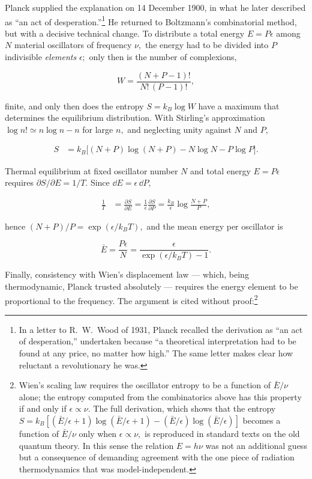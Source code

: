 Planck supplied the explanation on 14 December 1900, in what he later described as ``an act of desperation.''\footnote{In a letter to R.~W.~Wood of 1931, Planck recalled the derivation as ``an act of desperation,'' undertaken because ``a theoretical interpretation had to be found at any price, no matter how high.'' The same letter makes clear how reluctant a revolutionary he was.} He returned to Boltzmann's combinatorial method, but with a decisive technical change. To distribute a total energy $E=P\epsilon$ among $N$ material oscillators of frequency $\nu,$ the energy had to be divided into $P$ indivisible \emph{elements} $\epsilon;$ only then is the number of complexions,
\begin{linenomath}
    \begin{equation}
        W=\frac{(N+P-1)!}{N!\,(P-1)!},
    \end{equation}
\end{linenomath}
finite, and only then does the entropy $S=k_B\log W$ have a maximum that determines the equilibrium distribution. With Stirling's approximation $\log n!\simeq n\log n-n$ for large $n,$ and neglecting unity against $N$ and $P,$
\begin{linenomath}
    \begin{align}
        S&=k_B\bigl[(N+P)\log(N+P)-N\log N-P\log P\bigr].
    \end{align}
\end{linenomath}
Thermal equilibrium at fixed oscillator number $N$ and total energy $E=P\epsilon$ requires $\partial S/\partial E=1/T.$ Since $\dd E=\epsilon\,\dd P,$
\begin{linenomath}
    \begin{align}
        \frac{1}{T}&=\frac{\partial S}{\partial E}
        =\frac{1}{\epsilon}\frac{\partial S}{\partial P}
        =\frac{k_B}{\epsilon}\log\frac{N+P}{P},
    \end{align}
\end{linenomath}
hence $(N+P)/P=\exp(\epsilon/k_BT),$ and the mean energy per oscillator is
\begin{linenomath}
    \begin{equation}
        \bar{E}=\frac{P\epsilon}{N}=\frac{\epsilon}{\exp(\epsilon/k_BT)-1}.
    \end{equation}
\end{linenomath}
Finally, consistency with Wien's displacement law --- which, being thermodynamic, Planck trusted absolutely --- requires the energy element to be proportional to the frequency. The argument is cited without proof:\footnote{Wien's scaling law requires the oscillator entropy to be a function of $\bar E/\nu$ alone; the entropy computed from the combinatorics above has this property if and only if $\epsilon\propto\nu.$ The full derivation, which shows that the entropy $S=k_{B}[(\bar{E}/\epsilon+1)\log(\bar{E}/\epsilon+1)-(\bar{E}/\epsilon)\log(\bar{E}/\epsilon)]$ becomes a function of $\bar{E}/\nu$ only when $\epsilon\propto\nu,$ is reproduced in standard texts on the old quantum theory. In this sense the relation $E=h\nu$ was not an additional guess but a consequence of demanding agreement with the one piece of radiation thermodynamics that was model-independent.}
